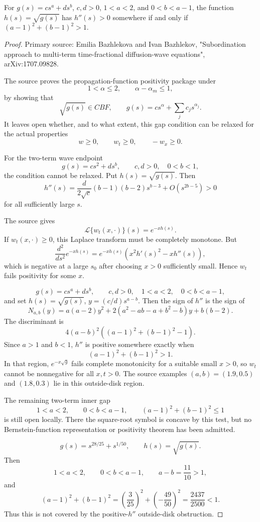 \begin{proposition}
\label{res:sqrt-two-term-symbol-concavity-loss-criterion}
For \(g(s)=c s^a+d s^b\), \(c,d>0\), \(1<a<2\), and \(0<b<a-1\), the function \(h(s)=\sqrt{g(s)}\) has \(h''(s)>0\) somewhere if and only if \((a-1)^2+(b-1)^2>1\).
\end{proposition}
\begin{proof}
Primary source: Emilia Bazhlekova and Ivan Bazhlekov, "Subordination approach to multi-term time-fractional diffusion-wave equations", arXiv:1707.09828.

The source proves the propagation-function positivity package under
\[
1<\alpha\le2,\qquad \alpha-\alpha_m\le1,
\]
by showing that
\[
\sqrt{g(s)}\in CBF,\qquad g(s)=c s^\alpha+\sum_j c_j s^{\alpha_j}.
\]
It leaves open whether, and to what extent, this gap condition can be relaxed for the actual properties
\[
w\ge0,\qquad w_t\ge0,\qquad -w_x\ge0.
\]

For the two-term wave endpoint
\[
g(s)=c s^2+d s^b,\qquad c,d>0,\quad 0<b<1,
\]
the condition cannot be relaxed. Put \(h(s)=\sqrt{g(s)}\). Then
\[
h''(s)=\frac{d}{2\sqrt c}(b-1)(b-2)s^{b-3}+O(s^{2b-5})>0
\]
for all sufficiently large \(s\).

The source gives
\[
\mathcal L\{w_t(x,\cdot)\}(s)=e^{-xh(s)}.
\]
If \(w_t(x,\cdot)\ge0\), this Laplace transform must be completely monotone. But
\[
\frac{d^2}{ds^2}e^{-xh(s)}
=e^{-xh(s)}\left(x^2h'(s)^2-xh''(s)\right),
\]
which is negative at a large \(s_0\) after choosing \(x>0\) sufficiently small. Hence \(w_t\) fails positivity for some \(x\).

\[
g(s)=c s^a+d s^b,\qquad c,d>0,\quad 1<a<2,\quad 0<b<a-1,
\]
and set \(h(s)=\sqrt{g(s)}\), \(y=(c/d)s^{a-b}\). Then the sign of \(h''\) is the sign of
\[
N_{a,b}(y)
=a(a-2)y^2
+2(a^2-ab-a+b^2-b)y
+b(b-2).
\]
The discriminant is
\[
4(a-b)^2\left((a-1)^2+(b-1)^2-1\right).
\]
Since \(a>1\) and \(b<1\), \(h''\) is positive somewhere exactly when
\[
(a-1)^2+(b-1)^2>1.
\]
In that region, \(e^{-x\sqrt g}\) fails complete monotonicity for a suitable small \(x>0\), so \(w_t\) cannot be nonnegative for all \(x,t>0\). The source examples \((a,b)=(1.9,0.5)\) and \((1.8,0.3)\) lie in this outside-disk region.

The remaining two-term inner gap
\[
1<a<2,\qquad 0<b<a-1,\qquad (a-1)^2+(b-1)^2\le1
\]
is still open locally. There the square-root symbol is concave by this test, but no Bernstein-function representation or positivity theorem has been admitted.

\[
g(s)=s^{28/25}+s^{1/50},\qquad h(s)=\sqrt{g(s)}.
\]
Then
\[
1<a<2,\qquad 0<b<a-1,\qquad a-b=\frac{11}{10}>1,
\]
and
\[
(a-1)^2+(b-1)^2
=\left(\frac3{25}\right)^2+\left(-\frac{49}{50}\right)^2
=\frac{2437}{2500}<1.
\]
Thus this is not covered by the positive-\(h''\) outside-disk obstruction.


\end{proof}
